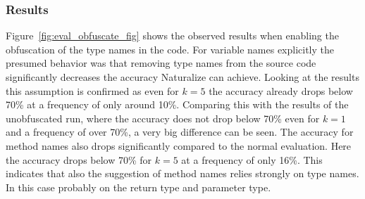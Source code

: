 \subsubsection{Results}
Figure~\ref{fig:eval_obfuscate_fig} shows the observed results when enabling the obfuscation of the type names in the code. For variable names explicitly the presumed behavior was that removing type names from the source code significantly decreases the accuracy Naturalize can achieve. Looking at the results this assumption is confirmed as even for $k=5$ the accuracy already drops below 70\% at a frequency of only around 10\%. Comparing this with the results of the unobfuscated run, where the accuracy does not drop below 70\% even for $k=1$ and a frequency of over 70\%, a very big difference can be seen. The accuracy for method names also drops significantly compared to the normal evaluation. Here the accuracy drops below 70\% for $k=5$ at a frequency of only 16\%. This indicates that also the suggestion of method names relies strongly on type names. In this case probably on the return type and parameter type.
\noindent{}
